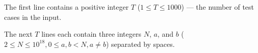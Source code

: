 The first line contains a positive integer $T$ ($1 \le T \le 1000$) --- the number of test cases in the input.

The next $T$ lines each contain three integers $N$, $a$, and $b$ ($2\leq{N}\leq{10^{18}}, 0 \le a,b<{N},a\neq{b}$) separated by spaces.
